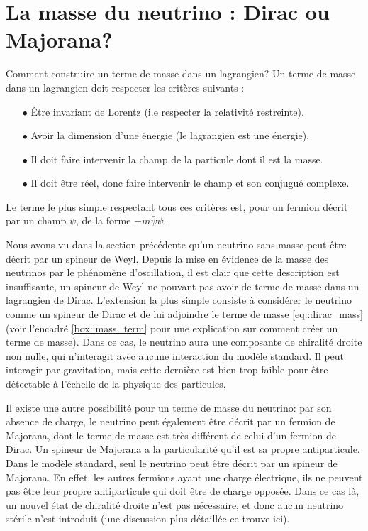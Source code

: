    \section{La masse du neutrino : Dirac ou Majorana?}\label{sec::dirac_majorana}

      \begin{activitybox}[label=box::mass_term]{Comment construire un terme de masse dans un lagrangien?}
        Un terme de masse dans un lagrangien doit respecter les critères suivants :
        \begin{itemize}
          \item[$\bullet$] Être invariant de Lorentz (i.e respecter la relativité restreinte).
          \item[$\bullet$] Avoir la dimension d'une énergie (le lagrangien est une énergie).
          \item[$\bullet$] Il doit faire intervenir la champ de la particule dont il est la masse.
          \item[$\bullet$] Il doit être réel, donc faire intervenir le champ et son conjugué complexe.
        \end{itemize}
        Le terme le plus simple respectant tous ces critères est, pour un fermion décrit par un champ $\psi$, de la forme $-m\bar{\psi}\psi$.
      \end{activitybox}

      Nous avons vu dans la section précédente qu'un neutrino sans masse peut être décrit par un spineur de Weyl. Depuis la mise en évidence de la masse des neutrinos par le phénomène d'oscillation, il est clair que cette description est insuffisante, un spineur de Weyl ne pouvant pas avoir de terme de masse dans un lagrangien de Dirac. L'extension la plus simple consiste à considérer le neutrino comme un spineur de Dirac et de lui adjoindre le terme de masse \eqref{eq::dirac_mass} (voir l'encadré \ref{box::mass_term} pour une explication sur comment créer un terme de masse). Dans ce cas, le neutrino aura une composante de chiralité droite non nulle, qui n'interagit avec aucune interaction du modèle standard. Il peut interagir par gravitation, mais cette dernière est bien trop faible pour être détectable à l'échelle de la physique des particules. 

      Il existe une autre possibilité pour un terme de masse du neutrino: par son absence de charge, le neutrino peut également être décrit par un fermion de Majorana, dont le terme de masse est très différent de celui d'un fermion de Dirac. Un spineur de Majorana a la particularité qu'il est sa propre antiparticule. Dans le modèle standard, seul le neutrino peut être décrit par un spineur de Majorana. En effet, les autres fermions ayant une charge électrique, ils ne peuvent pas être leur propre antiparticule qui doit être de charge opposée. Dans ce cas là, un nouvel état de chiralité droite n'est pas nécessaire, et donc aucun neutrino stérile n'est introduit (une discussion plus détaillée ce trouve ici\cite{Petcov2013}).

